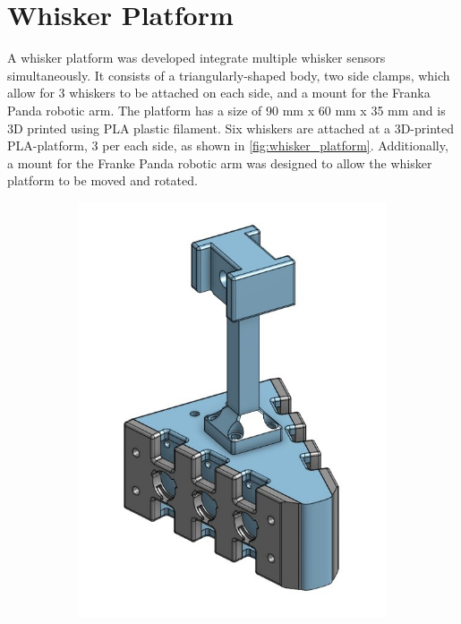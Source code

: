 \section{Whisker Platform}

A whisker platform was developed integrate multiple whisker sensors simultaneously.
It consists of a triangularly-shaped body, two side clamps, which allow for 3 whiskers to be attached on each side, and a mount for the Franka Panda robotic arm.
The platform has a size of 90 mm x 60 mm x 35 mm and is 3D printed using PLA plastic filament.
Six whiskers are attached at a 3D-printed PLA-platform, 3 per each side, as shown in \cref{fig:whisker_platform}.
Additionally, a mount for the Franke Panda robotic arm was designed to allow the whisker platform to be moved and rotated.


\begin{figure}[ht]
    \centering
    \begin{subfigure}[b]{0.45\textwidth} %
        \centering
        \includegraphics[height=0.3\textheight]{figures/platform-cad} %

\end{subfigure}
\end{figure}
